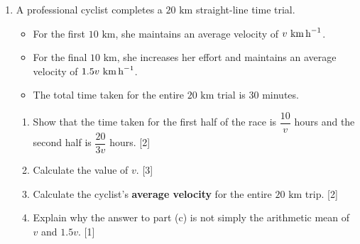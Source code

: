 \documentclass[12pt, twoside]{article}
\begin{document}
\begin{enumerate}[itemsep=0.15cm]
\newpage

\item A professional cyclist completes a $20 \text{ km}$ straight-line time trial.
\begin{itemize}[itemsep=0.1cm]
  \item For the first $10 \text{ km}$, she maintains an average velocity of $v \text{ km\,h}^{-1}$.
  \item For the final $10 \text{ km}$, she increases her effort and maintains an average velocity of $1.5v \text{ km\,h}^{-1}$.
  \item The total time taken for the entire $20 \text{ km}$ trial is 30 minutes.
\end{itemize}
\begin{enumerate}[itemsep=0.1cm]
  \item Show that the time taken for the first half of the race is $\dfrac{10}{v}$ hours
        and the second half is $\dfrac{20}{3v}$ hours. \hfill [2]
  \item Calculate the value of $v$. \hfill [3]
  \item Calculate the cyclist's \textbf{average velocity} for the entire $20 \text{ km}$ trip. \hfill [2]
  \item Explain why the answer to part (c) is not simply the arithmetic mean
        of $v$ and $1.5v$. \hfill [1]
\end{enumerate}

\vfill


\end{enumerate}
\end{document}
